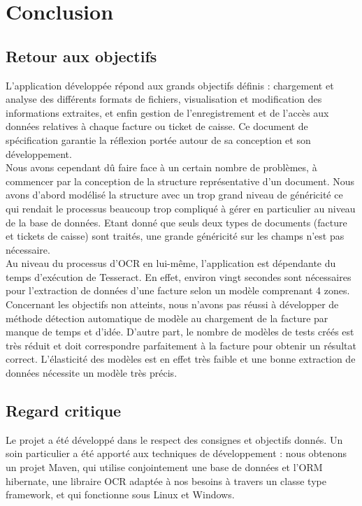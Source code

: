\chapter{Conclusion}

\section{Retour aux objectifs}

L'application développée répond aux grands objectifs définis : chargement et analyse des différents formats de fichiers, visualisation et modification des informations extraites, et enfin gestion de l'enregistrement et de l'accès aux données relatives à chaque facture ou ticket de caisse.
Ce document de spécification garantie la réflexion portée autour de sa conception et son développement.\\

Nous avons cependant dû faire face à un certain nombre de problèmes, à commencer par la conception de la structure représentative d'un document. Nous avons d'abord modélisé la structure avec un trop grand niveau de généricité ce qui rendait le processus beaucoup trop compliqué à gérer en particulier au niveau de la base de données. 
Etant donné que seuls deux types de documents (facture et tickets de caisse) sont traités, une grande généricité sur les champs n'est pas nécessaire.\\

Au niveau du processus d'OCR en lui-même, l'application est dépendante du temps d'exécution de Tesseract. En effet, environ vingt secondes sont nécessaires pour l'extraction de données d'une facture selon un modèle comprenant 4 zones.\\

Concernant les objectifs non atteints, nous n'avons pas réussi à développer de méthode détection automatique de modèle au chargement de la facture par manque de temps et d'idée. D'autre part, le nombre de modèles de tests créés est très réduit et doit correspondre parfaitement à la facture pour obtenir un résultat correct. L'élasticité des modèles est en effet très faible et une bonne extraction de données nécessite un modèle très précis.


\section{Regard critique}

Le projet a été développé dans le respect des consignes et objectifs donnés.
Un soin particulier a été apporté aux techniques de développement : nous obtenons un projet Maven, qui utilise conjointement une base de données et l'ORM hibernate, une libraire OCR adaptée à nos besoins à travers un classe type framework, et qui fonctionne sous Linux et Windows.\\

